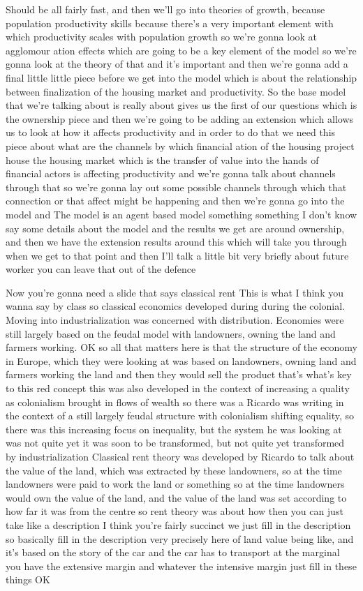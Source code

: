 Should be all fairly fast, and then we’ll go into theories of growth, because population productivity skills because there’s a very important element with which productivity scales with population growth so we’re gonna look at agglomour ation effects which are going to be a key element of the model so we’re gonna look at the theory of that and it’s important and then we’re gonna add a final little little piece before we get into the model which is about the relationship between finalization of the housing market and productivity. So the base model that we’re talking about is really about gives us the first of our questions which is the ownership piece and then we’re going to be adding an extension which allows us to look at how it affects productivity and in order to do that we need this piece about what are the channels by which financial ation of the housing project house the housing market which is the transfer of value into the hands of financial actors is affecting productivity and we’re gonna talk about channels through that so we’re gonna lay out some possible channels through which that connection or that affect might be happening and then we’re gonna go into the model and The model is an agent based model something something I don’t know say some details about the model and the results we get are around ownership, and then we have the extension results around this which will take you through when we get to that point and then I’ll talk a little bit very briefly about future worker you can leave that out of the defence

Now you’re gonna need a slide that says classical rent
This is what I think you wanna say by class so classical economics developed during during the colonial. Moving into industrialization was concerned with distribution. Economies were still largely based on the feudal model with landowners, owning the land and farmers working.
OK so all that matters here is that the structure of the economy in Europe, which they were looking at was based on landowners, owning land and farmers working the land and then they would sell the product that’s what’s key to this red concept this was also developed in the context of increasing a quality as colonialism brought in flows of wealth so there was a Ricardo was writing in the context of a still largely feudal structure with colonialism shifting equality, so there was this increasing focus on inequality, but the system he was looking at was not quite yet it was soon to be transformed, but not quite yet transformed by industrialization
Classical rent theory was developed by Ricardo to talk about the value of the land, which was extracted by these landowners, so at the time landowners were paid to work the land or something so at the time landowners would own the value of the land, and the value of the land was set according to how far it was from the centre so rent theory was about how then you can just take like a description I think you’re fairly succinct we just fill in the description so basically fill in the description very precisely here of land value being like, and it’s based on the story of the car and the car has to transport at the marginal you have the extensive margin and whatever the intensive margin just fill in these things OK

